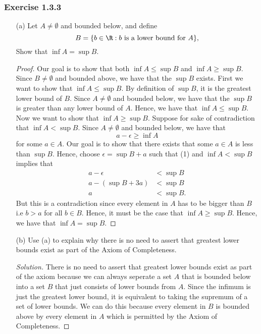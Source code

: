 \subsubsection{Exercise 1.3.3} \begin{enumerate} \item[(a)] Let \( A \neq \emptyset \) and bounded below, and define \[ B = \{ b \in \R : b \text{ is a lower bound for   } A  \},\] Show that \( \inf A = \sup B \). \begin{proof} Our goal is to show that both \( \inf A \leq \sup B \) and \( \inf A \geq \sup B \). Since \( B \neq \emptyset\) and bounded above, we have that the \( \sup B \) exists. First we want to show that \( \inf A \leq \sup B \). By definition of \( \sup B \), it is the greatest lower bound of \( B \). Since \( A \neq \emptyset \) and bounded below, we have that the \( \sup B \) is greater than any lower bound of \( A \). Hence, we have that \( \inf A \leq \sup B \). Now we want to show that \( \inf A \geq \sup B \). Suppose for sake of contradiction that \( \inf A < \sup B \). Since \( A \neq \emptyset\) and bounded below, we have that \[ a - \epsilon \geq \inf A \tag{1}\] for some \( a \in A \). Our goal is to show that there exists that some \( a \in A \) is less than \( \sup B \). Hence, choose \( \epsilon = \sup B + a \) such that (1) and \( \inf A < \sup B \) implies that \begin{align*} a - \epsilon &< \sup B \\ a - (\sup B + 3a) &< \sup B \\ a &< \sup B. \end{align*}  But this is a contradiction since every element in \(A  \) has to be bigger than \( B \) i.e \( b > a \) for all \( b \in B \). Hence, it must be the case that \(\inf A \geq \sup B  \). Hence, we have that \( \inf A = \sup B \). \end{proof} \item[(b)] Use (a) to explain why there is no need to assert that greatest lower bounds exist as part of the Axiom of Completeness. \begin{proof}[Solution] There is no need to assert that greatest lower bounds exist as part of the axiom because we can always seperate a set \( A \) that is bounded below into a set \( B \) that just consists of lower bounds from \( A \). Since the infimum is just the greatest lower bound, it is equivalent to taking the supremum of a set of lower bounds. We can do this because every element in \( B \) is bounded above by every element in \( A \) which is permitted by the Axiom of Completeness.  \end{proof}
\end{enumerate}


